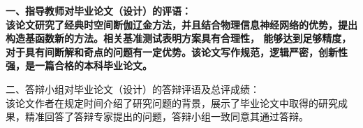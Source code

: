\cleardoublepage{}

{
    \bfseries
    \noindent 一、指导教师对毕业论文（设计）的评语：\\

    该论文研究了经典时空间断伽辽金方法，并且结合物理信息神经网络的优势，提出构造基函数新的方法。相关基准测试表明方案具有合理性，
    能够达到足够精度，对于具有间断解和奇点的问题有一定优势。该论文写作规范，逻辑严密，创新性强，是一篇合格的本科毕业论文。
    \mbox{} \vfill
    \signature{指导教师（签名）}

    \noindent 二、答辩小组对毕业论文（设计）的答辩评语及总评成绩：\\

    该论文作者在规定时间介绍了研究问题的背景，展示了毕业论文中取得的研究成果，精准回答了答辩专家提出的问题，答辩小组一致同意其通过答辩。
    \mbox{} \vfill

    \finaleval[9][13][4][62][88]

    \signature{负责人（签名）}
}
